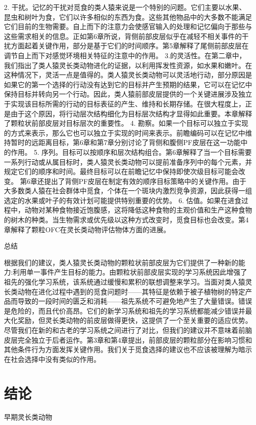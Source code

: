 2. 干扰。记忆的干扰对觅食的类人猿来说是一个特别的问题。它们主要以水果、昆虫和树叶为食，它们以许多相似的东西为食。这些其他物品中的大多数不能满足它们目前的生物需要。自上而下的注意力会使感官输入的处理和记忆偏向于那些与这些需求相关的信息。正如第6章所说，背侧前部皮层似乎在减轻不相关事件的干扰方面起着关键作用，部分是基于它们的时间顺序。第5章解释了尾侧前部皮层在调节自上而下对感觉环境相关特征的注意中的作用。
3.的灵活性。在第二章中，我们指出了类人猿灵长类动物进化的证据，以利用挥发性资源，如水果和嫩叶。在这种情况下，灵活一点是值得的。类人猿灵长类动物可以灵活地行动，部分原因是如果它的第一个选择的行动没有达到它的目标并产生预期的结果，它可以在记忆中保持目标并转向另一个行动。因此，类人猿前部皮层提供的一个关键进展涉及独立于实现该目标所需的行动的目标表征的产生、维持和长期存储。在很大程度上，正是由于这个原因，将行动层次结构细化为目标层次结构才显得如此重要。本章解释了颗粒状前部皮层对目标层次的重要性。
4. 勘察。如果一个目标可以独立于实现的方式来表示，那么它也可以独立于实现的时间来表示。前瞻编码可以在记忆中维持暂时的远距离目标，第6章和第7章分别讨论了背侧和腹侧PF皮层在这一功能中的作用。
5. 序列。目标可以按顺序和层次结构组合。第6章解释了当一个目标需要一系列行动或从属目标时，类人猿灵长类动物可以提前准备序列中的每个元素，并规定它们的顺序和时间。最终目标可以在前瞻记忆中保持即使次级目标可能会改变。
第6章还提出了背侧PF皮层在制定有效的顺序目标策略中的关键作用。由于大多数类人猿在社会群体中觅食，个体在一个斑块内激烈竞争资源，因此获得一组选定的水果或叶子的有效计划可能提供特别重要的优势。
6. 估值。如果在进食过程中，动物对某种食物接近饱腹感，这将降低这种食物的主观价值和生产这种食物的树木的种类。当生物需求或优先级以这种方式改变时，觅食目标也会改变。第4章解释了颗粒OFC在灵长类动物评估物体方面的进展。

总结

根据我们的建议，类人猿灵长类动物的颗粒状前部皮层为它们提供了一种新的能力:利用单一事件产生目标的能力。由颗粒状前部皮层实现的学习系统因此增强了祖先的强化学习系统，该系统通过缓慢和累积的联想调整来学习。当面对类人猿灵长类动物在进化过程中遇到的觅食问题时——其特征是依赖于被子植物树的特定产品而导致的一段时间的匮乏和消耗——祖先系统不可避免地产生了大量错误。错误是危险的，而且代价高昂。它们的新学习系统和祖先的学习系统都能减少错误并最大化奖励，但灵长类动物的前皮层做得更快，这提供了一个至关重要的适应优势。
尽管我们在新的和古老的学习系统之间进行了对比，但我们的建议并不意味着前脑皮层完全独立于后者运作。第3章和第4章提出，前部皮层的颗粒部分在影响习惯和其他条件行为方面发挥关键作用。我们关于觅食选择的建议也不应该被理解为暗示在社会选择中没有类似的作用。

\section{结论}
早期灵长类动物

